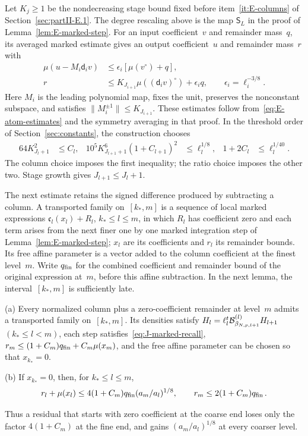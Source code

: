 Let $K_j\ge1$ be the nondecreasing stage bound fixed before item~\ref{it:E-columns} of Section~\ref{sec:partII-E.1}. The degree rescaling above is the map $\mathsf S_L$ in the proof of Lemma~\ref{lem:E-marked-step}. For an input coefficient~$v$ and remainder mass~$q$, its averaged marked estimate gives an output coefficient~$u$ and remainder mass~$r$ with
\begin{equation}\label{eq:J-marked-recall}
\begin{aligned}
\mu(u-M_i\mathsf d_iv)&\le\epsilon_i[\mu(v^\circ)+q],\\
r&\le K_{J_{i+1}}\mu((\mathsf d_iv)^\circ)+\epsilon_iq,\qquad\epsilon_i=\ell_i^{-3/8}.
\end{aligned}
\end{equation}
Here $M_i$ is the leading polynomial map, fixes the unit, preserves the nonconstant subspace, and satisfies $\|M_i^{\pm1}\|\le K_{J_{i+1}}$. These estimates follow from~\eqref{eq:E-atom-estimates} and the symmetry averaging in that proof. In the threshold order of Section~\ref{sec:constants}, the construction chooses
\begin{equation}\label{eq:J-stage-room}
\begin{aligned}
64K_{J_l+1}^2&\le C_l,&
10^5K_{J_{l+1}+1}^6(1+C_{l+1})^2&\le\ell_l^{1/8},&
1+2C_l&\le\ell_l^{1/40}.
\end{aligned}
\end{equation}
The column choice imposes the first inequality; the ratio choice imposes the other two. Stage growth gives $J_{l+1}\le J_l+1$.

The next estimate retains the signed difference produced by subtracting a column. A transported family on~$[k_*,m]$ is a sequence of local marked expressions $\mathfrak c_l(x_l)+R_l$, $k_*\le l\le m$, in which $R_l$ has coefficient zero and each term arises from the next finer one by one marked integration step of Lemma~\ref{lem:E-marked-step}; $x_l$ are its coefficients and $r_l$ its remainder bounds. Its free affine parameter is a vector added to the column coefficient at the finest level~$m$. Write $q_{\rm fin}$ for the combined coefficient and remainder bound of the original expression at~$m$, before this affine subtraction. In the next lemma, the interval~$[k_*,m]$ is sufficiently late.

\begin{lemma}\label{lem:J-signed-local}
(a) Every normalized column plus a zero-coefficient remainder at level~$m$ admits a transported family on~$[k_*,m]$. Its densities satisfy $H_l=\ell_l^t\mathcal{B}^{(l)}_{\beta_{N,p,l+1}}H_{l+1}$ $(k_*\le l<m)$, each step satisfies~\eqref{eq:J-marked-recall}, $r_m\le(1+C_m)q_{\rm fin}+C_m\mu(x_m)$, and the free affine parameter can be chosen so that $x_{k_*}=0$.

(b) If $x_{k_*}=0$, then, for $k_*\le l\le m$,
\begin{equation*}
r_l+\mu(x_l)\le4(1+C_m)q_{\rm fin}(a_m/a_l)^{1/8},\qquad
r_m\le2(1+C_m)q_{\rm fin}\,.
\end{equation*}
\end{lemma}
Thus a residual that starts with zero coefficient at the coarse end loses only the factor $4(1+C_m)$ at the fine end, and gains $(a_m/a_l)^{1/8}$ at every coarser level.

